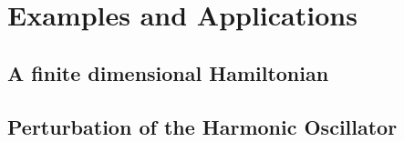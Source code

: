 \chapter{Examples and Applications}\label{ch:examples}
    \section{A finite dimensional Hamiltonian}
    \section{Perturbation of the Harmonic Oscillator}